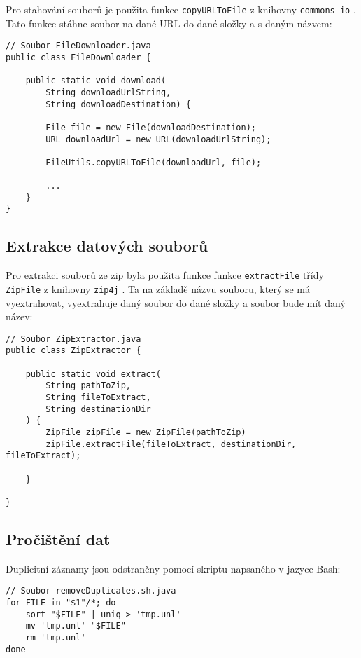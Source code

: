 \noindent Pro stahování souborů je použita funkce \lstinline|copyURLToFile| z knihovny \lstinline|commons-io| \cite{commons-io}. Tato funkce stáhne soubor na dané URL do dané složky a s daným názvem:

\newpage

\begin{lstlisting}[caption={Ukázka stahování dat pomocí knihovny \lstinline|commons-io|}, label={lst:common-io-downloader}, tabsize=2]
// Soubor FileDownloader.java
public class FileDownloader {
	
	public static void download(
		String downloadUrlString, 
		String downloadDestination) {
		
		File file = new File(downloadDestination);
		URL downloadUrl = new URL(downloadUrlString);
		
		FileUtils.copyURLToFile(downloadUrl, file);
	
		...
	}
}
\end{lstlisting}

\subsection{Extrakce datových souborů}
Pro extrakci souborů ze zip byla použita funkce funkce \lstinline|extractFile| třídy \lstinline|ZipFile| z knihovny \lstinline|zip4j| \cite{zip4j}. Ta na základě názvu souboru, který se má vyextrahovat, vyextrahuje daný soubor do dané složky a soubor bude mít daný název:

\begin{lstlisting}[caption={Ukázka extrakce souborů ze zipu}, label={lst:zip4j}, tabsize=2]
// Soubor ZipExtractor.java
public class ZipExtractor {

	public static void extract(
		String pathToZip, 
		String fileToExtract, 
		String destinationDir
	) {
		ZipFile zipFile = new ZipFile(pathToZip)
		zipFile.extractFile(fileToExtract, destinationDir, fileToExtract);
		
	}
		
}
\end{lstlisting}

\subsection{Pročištění dat}
Duplicitní záznamy jsou odstraněny pomocí skriptu napsaného v jazyce Bash:

\begin{lstlisting}[caption={Skript pro odstranění duplicitních řádků}, tabsize=2]
// Soubor removeDuplicates.sh.java
for FILE in "$1"/*; do
	sort "$FILE" | uniq > 'tmp.unl'
	mv 'tmp.unl' "$FILE"
	rm 'tmp.unl'
done
\end{lstlisting}

